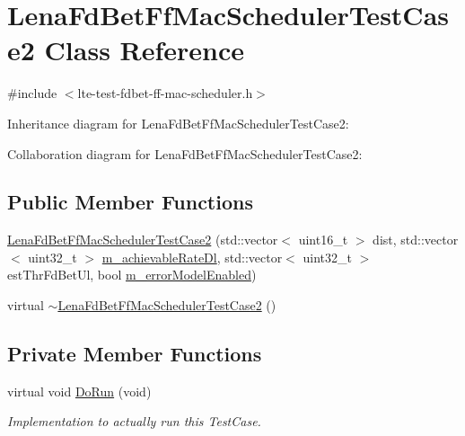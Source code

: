 \hypertarget{classLenaFdBetFfMacSchedulerTestCase2}{}\section{Lena\+Fd\+Bet\+Ff\+Mac\+Scheduler\+Test\+Case2 Class Reference}
\label{classLenaFdBetFfMacSchedulerTestCase2}


{\ttfamily \#include $<$lte-\/test-\/fdbet-\/ff-\/mac-\/scheduler.\+h$>$}



Inheritance diagram for Lena\+Fd\+Bet\+Ff\+Mac\+Scheduler\+Test\+Case2\+:


Collaboration diagram for Lena\+Fd\+Bet\+Ff\+Mac\+Scheduler\+Test\+Case2\+:
\subsection*{Public Member Functions}
\begin{DoxyCompactItemize}
\item 
\hyperlink{classLenaFdBetFfMacSchedulerTestCase2_abc5b5c7ccbd5eaf356d7566e395eb7ee}{Lena\+Fd\+Bet\+Ff\+Mac\+Scheduler\+Test\+Case2} (std\+::vector$<$ uint16\+\_\+t $>$ dist, std\+::vector$<$ uint32\+\_\+t $>$ \hyperlink{classLenaFdBetFfMacSchedulerTestCase2_aad2ad5fc6fa5eb0beb33a5ae45269c53}{m\+\_\+achievable\+Rate\+Dl}, std\+::vector$<$ uint32\+\_\+t $>$ est\+Thr\+Fd\+Bet\+Ul, bool \hyperlink{classLenaFdBetFfMacSchedulerTestCase2_a2925931eeed894cebffed3d453e739cd}{m\+\_\+error\+Model\+Enabled})
\item 
virtual \hyperlink{classLenaFdBetFfMacSchedulerTestCase2_ac02f4983efd4c78de7478484e67acca6}{$\sim$\+Lena\+Fd\+Bet\+Ff\+Mac\+Scheduler\+Test\+Case2} ()
\end{DoxyCompactItemize}
\subsection*{Private Member Functions}
\begin{DoxyCompactItemize}
\item 
virtual void \hyperlink{classLenaFdBetFfMacSchedulerTestCase2_a51c587a50f2087be7c3950f4d2d82852}{Do\+Run} (void)
\begin{DoxyCompactList}\small\item\em Implementation to actually run this Test\+Case. \end{DoxyCompactList}\end{DoxyCompactItemize}
